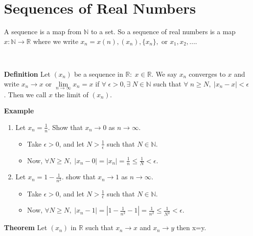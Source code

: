 \documentclass[12pt]{article}
\begin{document}
\section{Sequences of Real Numbers}
\begin{block}A sequence is a map from $\mathbb{N}$ to a set. So a sequence of real numbers is a map $x\colon \mathbb{N}\to\mathbb{R}$ where we write $x_n=x(n), (x_n), \{x_n\}, \text{ or } x_1,x_2,...$.\end{block} \\

\begin{block}{\bf Definition} Let $(x_n)$ be a sequence in $\mathbb{R}\colon\; x\in\mathbb{R}$. We say $x_n$ converges to $x$ and write $x_n\to x$ or $\lim\limits_{n\to\infty} x_n = x$ if $\forall\;\epsilon>0, \exists\;N\in\mathbb{N}$ such that $\forall\;n\ge N,\; |x_n-x|<\epsilon$. Then we call $x$ the limit of $(x_n)$.\end{block}

\vspace{1.5\baselineskip}
\begin{block}{\bf Example} 
\begin{enumerate}[label=(\roman*)]
    \item Let $x_n=\frac{1}{n}.$ Show that $x_n\to 0$ as $n\to\infty$.
    \begin{itemize}
        \item Take $\epsilon>0$, and let $N>\frac{1}{\epsilon}$ such that $N\in \mathbb{N}.$
        \item Now, $\forall N\ge N,\; |x_n-0|=|x_n| = \frac{1}{n}\le \frac{1}{N}<\epsilon$.
    \end{itemize}
    
    \item Let $x_n = 1-\frac{1}{n^2}$. show that $x_n\to 1$ as $n\to \infty$.
    \begin{itemize}
        \item Take $\epsilon>0$, and let $N>\frac{1}{\epsilon}$ such that $N\in \mathbb{N}.$
        \item Now, $\forall N\ge N,\; |x_n- 1|=|1-\frac{1}{n^2} -1| = \frac{1}{n^2} \le \frac{1}{N^2} < \epsilon$.
    \end{itemize}
\end{enumerate}
\end{block}

\vspace{1.5\baselineskip}
\begin{block}{\bf Theorem} Let $(x_n)$ in $\mathbb{R}$ such that $x_n\to x$ and $x_n\to y$ then x=y.\end{block}
\end{document}
